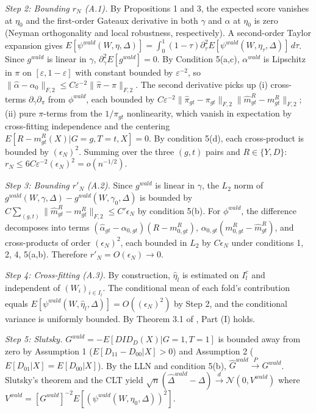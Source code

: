 \begin{theoremproof}
    \textit{Step 2: Bounding $r_N$ (A.1).} By Propositions 1 and 3, the expected score vanishes at $\eta_0$ and the first-order Gateaux derivative in both $\gamma$ and $\alpha$ at $\eta_0$ is zero (Neyman orthogonality and local robustness, respectively). A second-order Taylor expansion gives $E[\psi^{wald}(W, \eta, \Delta)] = \int_0^1 (1-\tau) \partial^2_\tau E[\psi^{wald}(W, \eta_\tau, \Delta)] \, d\tau$. Since $g^{wald}$ is linear in $\gamma$, $\partial^2_\gamma E[g^{wald}] = 0$. By Condition 5(a,c), $\alpha^{wald}$ is Lipschitz in $\pi$ on $[\varepsilon,1-\varepsilon]$ with constant bounded by $\varepsilon^{-2}$, so $\|\hat{\alpha}-\alpha_0\|_{F,2} \leq C\varepsilon^{-2}\|\hat{\pi}-\pi\|_{F,2}$. The second derivative picks up (i) cross-terms $\partial_\gamma \partial_\pi$ from $\phi^{wald}$, each bounded by $C\varepsilon^{-2}\|\hat{\pi}_{gt} - \pi_{gt}\|_{F,2} \|\hat{m}^R_{gt} - m^R_{gt}\|_{F,2}$; (ii) pure $\pi$-terms from the $1/\pi_{gt}$ nonlinearity, which vanish in expectation by cross-fitting independence and the centering $E[R - m^R_{gt}(X) | G=g, T=t, X] = 0$. By condition 5(d), each cross-product is bounded by $(\epsilon_N)^2$. Summing over the three $(g,t)$ pairs and $R \in \{Y, D\}$: $r_N \leq 6C\varepsilon^{-2}(\epsilon_N)^2 = o(n^{-1/2})$.

    \textit{Step 3: Bounding $r'_N$ (A.2).} Since $g^{wald}$ is linear in $\gamma$, the $L_2$ norm of $g^{wald}(W, \gamma, \Delta) - g^{wald}(W, \gamma_0, \Delta)$ is bounded by $C\sum_{(g,t)}\|\hat{m}^R_{gt} - m^R_{gt}\|_{F,2} \leq C'\epsilon_N$ by condition 5(b). For $\phi^{wald}$, the difference decomposes into terms $(\hat{\alpha}_{gt} - \alpha_{0,gt})(R - m^R_{0,gt})$, $\alpha_{0,gt}(m^R_{0,gt} - \hat{m}^R_{gt})$, and cross-products of order $(\epsilon_N)^2$, each bounded in $L_2$ by $C\epsilon_N$ under conditions 1, 2, 4, 5(a,b). Therefore $r'_N = O(\epsilon_N) \to 0$.

    \textit{Step 4: Cross-fitting (A.3).} By construction, $\hat{\eta}_l$ is estimated on $I_l^c$ and independent of $(W_i)_{i \in I_l}$. The conditional mean of each fold's contribution equals $E[\psi^{wald}(W, \hat{\eta}_l, \Delta)] = O((\epsilon_N)^2)$ by Step 2, and the conditional variance is uniformly bounded. By Theorem 3.1 of \cite{DDML2018}, Part (I) holds.

    \textit{Step 5: Slutsky.} $G^{wald} = -E[DID_D(X) | G=1, T=1]$ is bounded away from zero by Assumption 1 ($E[D_{11} - D_{00} | X] > 0$) and Assumption 2 ($E[D_{01}|X] = E[D_{00}|X]$). By the LLN and condition 5(b), $\hat{G}^{wald} \xrightarrow{P} G^{wald}$. Slutsky's theorem and the CLT yield $\sqrt{n}(\hat{\Delta}^{wald} - \Delta) \xrightarrow{d} \mathcal{N}(0, V^{wald})$ where $V^{wald} = [G^{wald}]^{-2} E[(\psi^{wald}(W, \eta_0, \Delta))^2]$.


\end{theoremproof}

